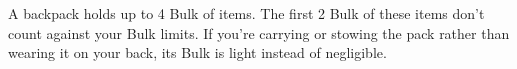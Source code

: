 

A backpack holds up to 4 Bulk of items. 
The first 2 Bulk of these items don't count against your Bulk limits. 
If you're carrying or stowing the pack rather than wearing it on your back, its Bulk is light instead of negligible.


\vfill

\ItemPrice{1sp}
\ItemBulk{-}
\hfill{}

